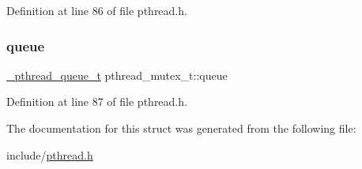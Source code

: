Definition at line 86 of file pthread.\+h.

\mbox{\label{structpthread__mutex__t_ab728fbc3d459db0f6211f3d2efc7155f}} 
\subsubsection{\texorpdfstring{queue}{queue}}
{\footnotesize\ttfamily \mbox{\hyperlink{pthread_8h_a547e924a1dbc72063242456b6390011e}{\+\_\+pthread\+\_\+queue\+\_\+t}} pthread\+\_\+mutex\+\_\+t\+::queue}



Definition at line 87 of file pthread.\+h.



The documentation for this struct was generated from the following file\+:\begin{DoxyCompactItemize}
\item 
include/\mbox{\hyperlink{pthread_8h}{pthread.\+h}}\end{DoxyCompactItemize}
